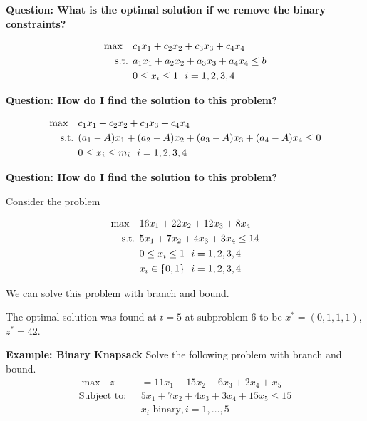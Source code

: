 \textbf{Question: What is the optimal solution if we remove the binary constraints?}




\begin{align*}
\max \quad & c_1 x_1 + c_2 x_2 + c_3 x_3 + c_4 x_4\\
\mbox{ s.t. } & a_1 x_1 + a_2 x_2 + a_3 x_3 + a_4 x_4 \leq b\\
& 0 \leq x_i \leq 1 \ \ i=1,2,3,4\\
\end{align*}

\textbf{Question: How do I find the solution to this problem?}


\begin{align*}
\max \quad & c_1 x_1 + c_2 x_2 + c_3 x_3 + c_4 x_4\\
\mbox{ s.t. } & (a_1 - A)x_1 + (a_2-A) x_2 + (a_3-A) x_3 + (a_4-A) x_4 \leq 0\\
& 0 \leq x_i \leq m_i \ \ i=1,2,3,4\\
\end{align*}

\textbf{Question: How do I find the solution to this problem?}



Consider the problem 

\begin{align*}
\max \quad & 16x_1 + 22x_2 + 12x_3 + 8 x_4\\
\mbox{ s.t. } & 5x_1 + 7x_2 + 4x_3 + 3x_4 \leq 14\\
& 0 \leq x_i \leq 1 \ \ i=1,2,3,4\\
& x_i \in \{0,1\} \ \ i=1,2,3,4
\end{align*}

We can solve this problem with branch and bound.


The optimal solution was found at $t=5$ at subproblem 6 to be $x^* = (0,1,1,1)$, $z^* = 42$.



\textbf{Example: Binary Knapsack}
Solve the following problem with branch and bound.
\begin{align*}
\max\ \ \   z&=11x_1+15x_2+6x_3+2x_4 + x_5\\
\text{Subject to:} \ \ \ 	 &5x_1+7x_2+4x_3+3x_4 + 15x_5\leq15\\
		&x_i  \text{  binary},i=1,\dots,5
\end{align*}




